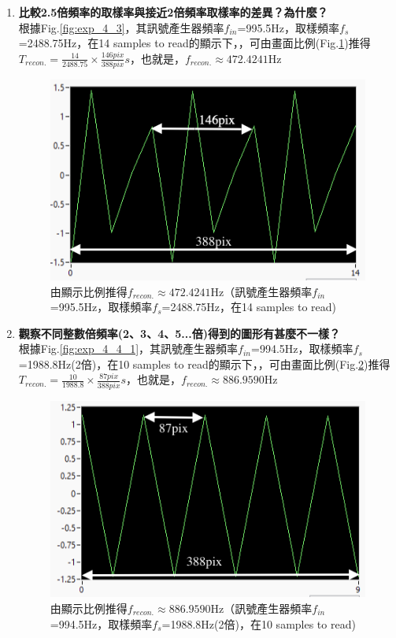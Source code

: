 \documentclass[12pt,a4paper]{article}
\begin{document}
\begin{CJK}{UTF8}{bkai}
\begin{enumerate}
\clearpage


\item \textbf{比較2.5倍頻率的取樣率與接近2倍頻率取樣率的差異？為什麼？}\\
根據Fig.\ref{fig:exp_4_3}，其訊號產生器頻率$f_{in}$=995.5Hz，取樣頻率$f_{s}$=2488.75Hz，在14 samples to read的顯示下，，可由畫面比例(Fig.\ref{fig:exp_4_3_crop})推得$T_{recon.}=\frac{14}{2488.75}\times\frac{146pix}{388pix}s$，也就是，$f_{recon.}\approx472.4241$Hz

\begin{figure}[h]
    \centering
    \includegraphics[width=0.6\linewidth]{figures/exp_4_3_crop.png}
    \caption{由顯示比例推得$f_{recon.}\approx472.4241$Hz（訊號產生器頻率$f_{in}$=995.5Hz，取樣頻率$f_{s}$=2488.75Hz，在14 samples to read)}
    \label{fig:exp_4_3_crop}
\end{figure}




\item \textbf{觀察不同整數倍頻率(2、3、4、5...倍)得到的圖形有甚麼不一樣？}\\

根據Fig.\ref{fig:exp_4_4_1}，其訊號產生器頻率$f_{in}$=994.5Hz，取樣頻率$f_{s}$=1988.8Hz(2倍)，在10 samples to read的顯示下，，可由畫面比例(Fig.\ref{fig:exp_4_4_1_crop})推得$T_{recon.}=\frac{10}{1988.8}\times\frac{87pix}{388pix}s$，也就是，$f_{recon.}\approx886.9590$Hz

\begin{figure}[h]
    \centering
    \includegraphics[width=0.6\linewidth]{figures/exp_4_4_1_crop.png}
    \caption{由顯示比例推得$f_{recon.}\approx886.9590$Hz（訊號產生器頻率$f_{in}$=994.5Hz，取樣頻率$f_{s}$=1988.8Hz(2倍)，在10 samples to read)}
    \label{fig:exp_4_4_1_crop}
\end{figure}


\end{enumerate}
\end{CJK}
\end{document}
